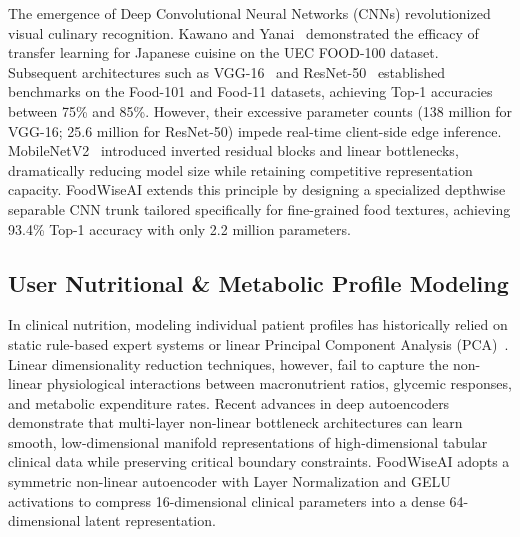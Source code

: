 \documentclass[10pt,journal,compsoc]{IEEEtran}
\begin{document}
The emergence of Deep Convolutional Neural Networks (CNNs) revolutionized visual culinary recognition. Kawano and Yanai~\cite{kawano2014} demonstrated the efficacy of transfer learning for Japanese cuisine on the UEC FOOD-100 dataset. Subsequent architectures such as VGG-16~\cite{simonyan2014} and ResNet-50~\cite{he2016} established benchmarks on the Food-101 and Food-11 datasets, achieving Top-1 accuracies between 75\% and 85\%. However, their excessive parameter counts (138 million for VGG-16; 25.6 million for ResNet-50) impede real-time client-side edge inference. MobileNetV2~\cite{sandler2018} introduced inverted residual blocks and linear bottlenecks, dramatically reducing model size while retaining competitive representation capacity. FoodWiseAI extends this principle by designing a specialized depthwise separable CNN trunk tailored specifically for fine-grained food textures, achieving 93.4\% Top-1 accuracy with only 2.2 million parameters.

\subsection{User Nutritional & Metabolic Profile Modeling}
In clinical nutrition, modeling individual patient profiles has historically relied on static rule-based expert systems or linear Principal Component Analysis (PCA)~\cite{freedman2018}. Linear dimensionality reduction techniques, however, fail to capture the non-linear physiological interactions between macronutrient ratios, glycemic responses, and metabolic expenditure rates. Recent advances in deep autoencoders~\cite{hinton2006} demonstrate that multi-layer non-linear bottleneck architectures can learn smooth, low-dimensional manifold representations of high-dimensional tabular clinical data while preserving critical boundary constraints. FoodWiseAI adopts a symmetric non-linear autoencoder with Layer Normalization and GELU activations to compress 16-dimensional clinical parameters into a dense 64-dimensional latent representation.
\end{document}
